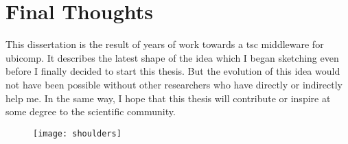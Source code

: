 \section{Final Thoughts}


This dissertation is the result of years of work towards a \acl{tsc} middleware for \acl{ubicomp}.
It describes the latest shape of the idea which I began sketching even before I finally decided to start this thesis.
But the evolution of this idea would not have been possible without other researchers who have directly or indirectly help me. %
In the same way, I hope that this thesis will contribute or inspire at some degree to the scientific community.

\bigskip

\begin{figure}[h]
    \centering
    \texttt{[image: shoulders]}
    \caption*{}{ }
    \label{fig:shouldersOfGiants}
\end{figure}